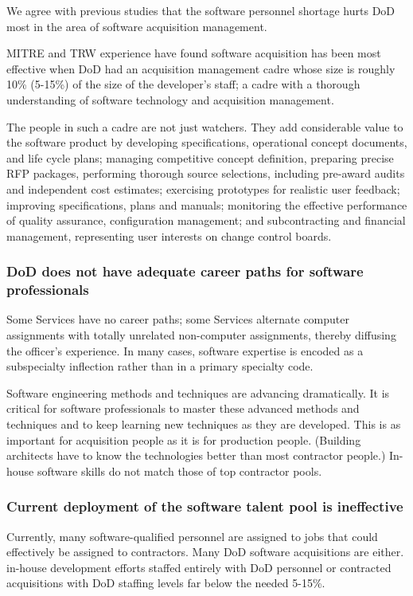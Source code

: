 \documentclass[12pt]{article}
\begin{document}
We agree with previous studies that the software personnel shortage hurts DoD
most in the area of software acquisition management.

MITRE and TRW experience have found software acquisition has been most
effective when DoD had an acquisition management cadre whose size is roughly
10\% (5-15\%) of the size of the developer's staff; a cadre with a thorough
understanding of software technology and acquisition management.

The people in such a cadre are not just watchers. They add considerable value
to the software product by developing specifications, operational concept
documents, and life cycle plans; managing competitive concept definition,
preparing precise RFP packages, performing thorough source selections,
including pre-award audits and independent cost estimates; exercising
prototypes for realistic user feedback; improving specifications, plans and
manuals; monitoring the effective performance of quality assurance,
configuration management; and subcontracting and financial management,
representing user interests on change control boards.

\subsubsection*{DoD does not have adequate career paths for software professionals}

Some Services have no career paths; some Services alternate computer
assignments with totally unrelated non-computer assignments, thereby diffusing
the officer's experience. In many cases, software expertise is encoded as a
subspecialty inflection rather than in a primary specialty code.

Software engineering methods and techniques are advancing dramatically. It is
critical for software professionals to master these advanced methods and
techniques and to keep learning new techniques as they are developed. This is
as important for acquisition people as it is for production people. (Building
architects have to know the technologies better than most contractor people.)
In-house software skills do not match those of top contractor pools.

\subsubsection*{Current deployment of the software talent pool is ineffective}

Currently, many software-qualified personnel are assigned to jobs that could
effectively be assigned to contractors. Many DoD software acquisitions are
either. in-house development efforts staffed entirely with DoD personnel or
contracted acquisitions with DoD staffing levels far below the needed 5-15\%.
\end{document}
